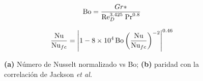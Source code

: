 \begin{equation}
\text{Bo}= \frac{Gr*}{\text{Re}_D^{3.425} \hspace*{1mm} \text{Pr}^{0.8}}
\label{eq:jackson_bo}
\end{equation}

\begin{equation}
\frac{\text{Nu}}{\text{Nu}_{fc}} =
\left\vert 1 - 8 \times 10^4 \hspace*{0.5mm} \text{Bo}
\left( \frac{\text{Nu}}{\text{Nu}_{fc}} \right)^{-2} \right\vert^{0.46}
\label{eq:jackson_corr}
\end{equation}

\begin{figure}[H]
  \centering
  \caption{\textbf{(a)} Número de Nusselt normalizado vs Bo; \textbf{(b)} paridad con la correlación de Jackson \textit{et al.}}
  \label{fig:nusselt}
\end{figure}




